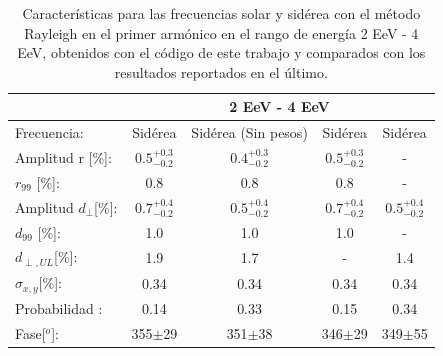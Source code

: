 \begin{table}[H]
    \begin{small}
        \begin{center}
            \begin{tabular}[c]{l|c|c|c|c|}
                                            & \multicolumn{4}{|c|}{2 EeV - 4 EeV}                                                               \\ \hline
                Frecuencia:                 & Sidérea              & Sidérea (Sin pesos)  & Sidérea \cite{codigo}    & Sidérea \cite{Aab_2020}   \\ \hline
                Amplitud r [\%]:            & $0.5^{+0.3}_{-0.2}$ & $0.4^{+0.3}_{-0.2}$ & $0.5^{+0.3}_{-0.2}$     & -                          \\
                $r_{99}$ [\%]:              & 0.8                 & 0.8                 & 0.8                     & -                          \\\hline
                Amplitud $d_\perp$[\%]:     & $0.7^{+0.4}_{-0.2}$ & $0.5^{+0.4}_{-0.2}$ & $0.7^{+0.4}_{-0.2}$ 	  & $0.5^{+0.4}_{-0.2}$                    \\
                $d_{99}$ [\%]:              & 1.0                 & 1.0                 & 1.0                     & -                         \\
                $d_{\perp,UL}$[\%]:         & 1.9                 & 1.7                 & -                       & 1.4                               \\\hline
                $\sigma_{x,y}$[\%]:         & 0.34	              & 0.34	            & 0.34	                  & 0.34                           \\
                Probabilidad      :         & 0.14                & 0.33                & 0.15               	  & 0.34                       \\
                Fase[$^o$]:                 & 355$\pm$29          & 351$\pm$38          & 346$\pm$29              & 349$\pm$55                    \\\hline
            \end{tabular}
        \end{center}
    \end{small}
    \caption{Características para las frecuencias solar y sidérea con el método Rayleigh en el primer armónico en el rango de energía 2 EeV - 4 EeV, obtenidos con el código de este trabajo \cite{Aab_2020} y comparados con los resultados reportados en el último.}
\end{table}


